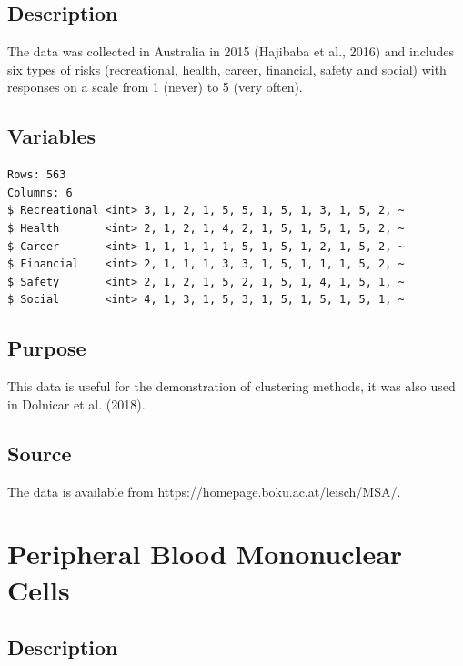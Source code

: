 \documentclass[
  letterpaper,
]{krantz}
\begin{document}
\subsection*{Description}\label{description-11}

The data was collected in Australia in 2015 (Hajibaba et al., 2016) and
includes six types of risks (recreational, health, career, financial,
safety and social) with responses on a scale from 1 (never) to 5 (very
often).

\subsection*{Variables}\label{variables-11}

\begin{verbatim}
Rows: 563
Columns: 6
$ Recreational <int> 3, 1, 2, 1, 5, 5, 1, 5, 1, 3, 1, 5, 2, ~
$ Health       <int> 2, 1, 2, 1, 4, 2, 1, 5, 1, 5, 1, 5, 2, ~
$ Career       <int> 1, 1, 1, 1, 1, 5, 1, 5, 1, 2, 1, 5, 2, ~
$ Financial    <int> 2, 1, 1, 1, 3, 3, 1, 5, 1, 1, 1, 5, 2, ~
$ Safety       <int> 2, 1, 2, 1, 5, 2, 1, 5, 1, 4, 1, 5, 1, ~
$ Social       <int> 4, 1, 3, 1, 5, 3, 1, 5, 1, 5, 1, 5, 1, ~
\end{verbatim}

\subsection*{Purpose}\label{purpose-11}

This data is useful for the demonstration of clustering methods, it was
also used in Dolnicar et al. (2018).

\subsection*{Source}\label{source-11}

The data is available from https://homepage.boku.ac.at/leisch/MSA/.

\section{Peripheral Blood Mononuclear
Cells}\label{peripheral-blood-mononuclear-cells}

\subsection*{Description}\label{description-12}
\end{document}
